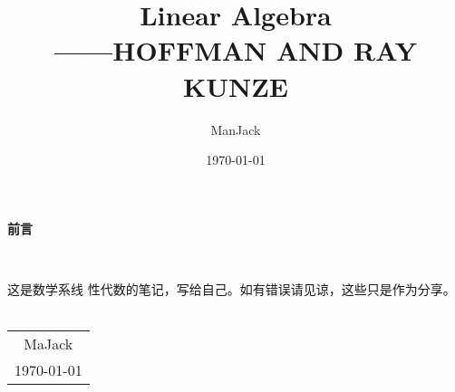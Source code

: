 \documentclass[11pt, a4paper, oneside,UTF8]{ctexbook}
\title{{\Huge{\textbf{Linear Algebra}}}\\------HOFFMAN AND RAY KUNZE}
\author{ManJack}
\date{\today}
\newtheorem[M]{theorem}{Theorem}[section]
\newtheorem[M]{lemma}[theorem]{Lemma}
\newtheorem[M]{proposition}[theorem]{Proposition}
\newtheorem[M]{corollary}[theorem]{Corollary}
\newtheorem[M]{definition}{Definition}[section]
\begin{document}
\maketitle

\setcounter{page}{1}
\newpage
\begin{center}
	\Huge\textbf{前言}
\end{center}~\

这是数学系线      性代数的笔记，写给自己。如有错误请见谅，这些只是作为分享。
~
\begin{flushright}
	\begin{tabular}{c}
		MaJack \\
		\today
	\end{tabular}
\end{flushright}

\newpage
{}
\setcounter{page}{1}

\tableofcontents
\newpage
\setcounter{page}{1}



\end{document}
